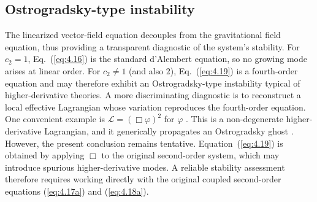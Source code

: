 \documentclass[aps,prd,twocolumn]{revtex4-2}
\begin{document}
\subsection{Ostrogradsky-type instability}\label{sec:IV.B}
The linearized vector-field equation decouples from the gravitational field equation, thus providing a transparent diagnostic of the system's stability. For $c_2=1$, Eq.~(\ref{eq:4.16}) is the standard d'Alembert equation, so no growing mode arises at linear order. For $c_2\neq1$ (and also $2$), Eq.~(\ref{eq:4.19}) is a fourth-order equation and may therefore exhibit an Ostrogradsky-type instability typical of higher-derivative theories. A more discriminating diagnostic is to reconstruct a local effective Lagrangian whose variation reproduces the fourth-order equation. One convenient example is $\mathcal{L}=(\Box\varphi)^2$ for $\varphi$ \cite{deRham2016.JCAP.06.041,ReLagrangian}. This is a non-degenerate higher-derivative Lagrangian, and it generically propagates an Ostrogradsky ghost \cite{Delhom.arXiv.2207.13431}. However, the present conclusion remains tentative. Equation~(\ref{eq:4.19}) is obtained by applying $\Box$ to the original second-order system, which may introduce spurious higher-derivative modes. A reliable stability assessment therefore requires working directly with the original coupled second-order equations (\ref{eq:4.17a}) and (\ref{eq:4.18a}).
\end{document}
